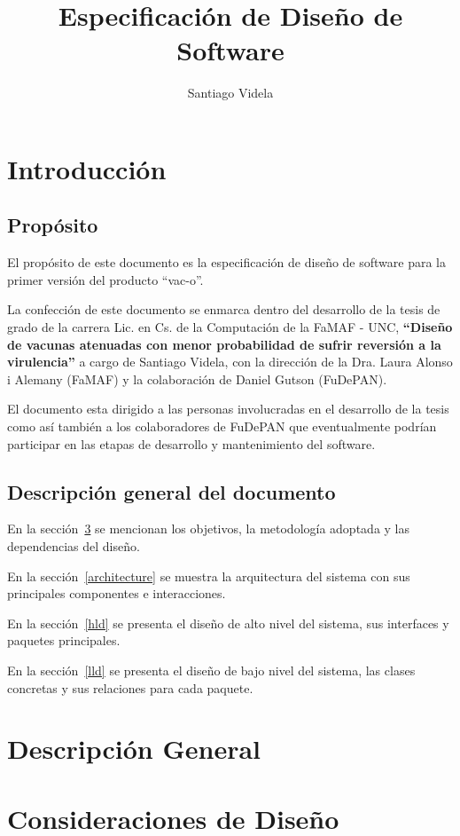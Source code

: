\documentclass[a4paper,10pt]{article}
\author{Santiago Videla}
\title{Especificaci\'on de Dise\~no de Software}
\begin{document}
\maketitle
\newpage
\tableofcontents
\newpage
\section{Introducci\'on}
  \subsection{Prop\'osito}
  El prop\'osito de este documento es la especificaci\'on de
dise\~no de software para la primer versi\'on del producto ``vac-o''.

  La confecci\'on de este documento se enmarca dentro del desarrollo de la tesis
de grado de la carrera Lic. en Cs. de la Computaci\'on de la FaMAF - UNC,
\textbf{``Dise\~no de vacunas atenuadas con menor probabilidad de sufrir
reversi\'on a la virulencia''} a cargo de Santiago Videla, con la direcci\'on
de la Dra. Laura Alonso i Alemany (FaMAF) y la colaboraci\'on de Daniel
Gutson (FuDePAN).

  El documento esta dirigido a las personas involucradas en el desarrollo de la
tesis como as\'i tambi\'en a los colaboradores de FuDePAN que eventualmente
podr\'ian participar en las etapas de desarrollo y mantenimiento del software.

  \subsection{Descripci\'on general del documento}
  En la secci\'on~\ref{considerations} se mencionan los objetivos, la
metodolog\'ia adoptada y las dependencias del dise\~no.

  En la secci\'on~\ref{architecture} se muestra la arquitectura del
sistema con sus principales componentes e interacciones.

  En la secci\'on~\ref{hld} se presenta el dise\~no de alto nivel del sistema,
sus interfaces y paquetes principales.

  En la secci\'on~\ref{lld} se presenta el dise\~no de bajo nivel del sistema,
las clases concretas y sus relaciones para cada paquete.

\section{Descripci\'on General}

\section{Consideraciones de Dise\~no}
  \label{considerations}
\end{document}
